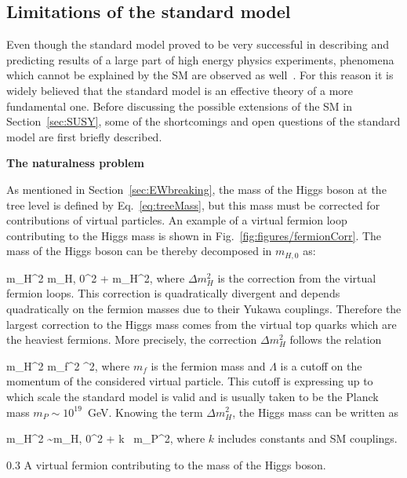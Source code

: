 \subsection{Limitations of the standard model~\label{sec:shortcomings}}

Even though the standard model proved to be very successful in describing and predicting results of a large part of high energy physics experiments, phenomena which cannot be explained by the SM are observed as well~\cite{9783527406012}. For this reason it is widely believed that the standard model is an effective theory  of a more fundamental one. Before discussing the possible extensions of the SM in Section~\ref{sec:SUSY}, some of the shortcomings and open questions of the standard model are first briefly described.


\textbf{The naturalness problem}

As mentioned in Section~\ref{sec:EWbreaking}, the mass of the Higgs boson at the tree level is defined by Eq.~\ref{eq:treeMass}, but this mass must be corrected for contributions of virtual particles. An example of a virtual fermion loop contributing to the Higgs mass is shown in Fig.~\ref{fig:figures/fermionCorr}. The mass of the Higgs boson can be thereby decomposed in $m_{H,0}$ as:

{
m_{H}^{2} \approx m_{H, 0}^{2} + \Delta m_{H}^{2},
}
where $\Delta m_{H}^{2}$ is the correction from the virtual fermion loops. This correction is quadratically divergent and depends quadratically on the fermion masses due to their Yukawa couplings. Therefore the largest correction to the Higgs mass comes from the virtual top quarks which are the heaviest fermions. More precisely, the correction $\Delta m_{H}^{2}$ follows the relation

{
\Delta m_{H}^{2} \propto m_{f}^{2} \Lambda^2,
}
where $m_f$ is the fermion mass and $\Lambda$ is a cutoff on the momentum of the considered virtual particle. This cutoff is expressing up to which scale the standard model is valid and is usually taken to be the Planck mass $m_{P} \sim  10^{19}$~GeV. Knowing the term $\Delta m_{H}^{2}$, the Higgs mass can be written as

{
m_{H}^{2} \sim m_{H, 0}^{2} + k ~m_{P}^{2},
}
where $k$ includes constants and SM couplings. 

                 {0.3}       %
                 { A virtual fermion contributing to the mass of the Higgs boson. }

